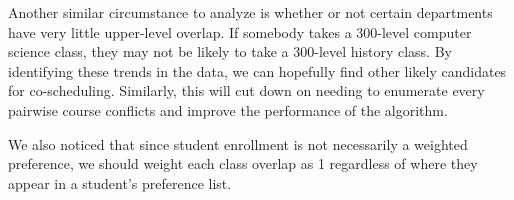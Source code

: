 \documentclass[11pt, oneside]{article}   	%
\begin{document}
Another similar circumstance to analyze is whether or not certain departments have very little upper-level overlap. If somebody takes a 300-level computer science class, they may not be likely to take a 300-level history class. By identifying these trends in the data, we can hopefully find other likely candidates for co-scheduling. Similarly, this will cut down on needing to enumerate every pairwise course conflicts and improve the performance of the algorithm.

We also noticed that since student enrollment is not necessarily a weighted preference, we should weight each class overlap as 1 regardless of where they appear in a student's preference list. 
\end{document}
